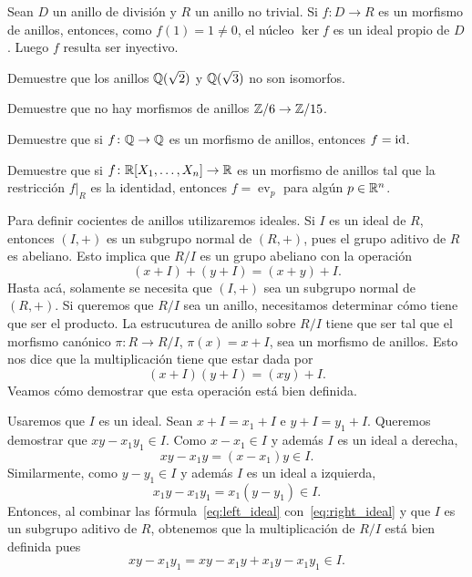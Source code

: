 \begin{example}
Sean $D$ un anillo de división y $R$ un anillo no trivial. Si $f\colon D\to R$ es un morfismo de anillos, entonces, como $f(1)=1\ne0$,
el núcleo $\ker f$ es un ideal propio de $D$. Luego $f$ resulta ser inyectivo.   	 
\end{example}

\begin{exercise}
\label{xca:sqrt2sqrt3}
Demuestre que los anillos $\mathbb{Q}(\sqrt{2})$ y $\mathbb{Q}(\sqrt{3})$ no son isomorfos.	
\end{exercise}

\begin{exercise}
\label{xca:Z6Z15}
Demuestre que no hay morfismos de anillos $\mathbb{Z}/6\to\mathbb{Z}/15$. 	
\end{exercise}

\begin{exercise}
Demuestre que si $f\colon \mathbb{Q}\to\mathbb{Q}$ es un morfismo de anillos, entonces $f=\operatorname{id}$.  	
\end{exercise}

\begin{exercise}
Demuestre que si $f\colon\mathbb{R}[X_1,\dots,X_n]\to\mathbb{R}$ es un morfismo de anillos tal que la restricción $f|_R$ es la identidad, entonces $f=\operatorname{ev}_{p}$ para algún $p\in\mathbb{R}^n$. 	
\end{exercise}

Para definir cocientes de anillos utilizaremos ideales. Si $I$ es
un ideal de $R$, entonces $(I,+)$ es un subgrupo normal de $(R,+)$, pues el grupo aditivo de $R$ es abeliano. Esto implica que
$R/I$ es un grupo abeliano con la operación
\[
(x+I)+(y+I)=(x+y)+I.
\]
Hasta acá, solamente se necesita que $(I,+)$ sea un subgrupo normal de $(R,+)$. Si queremos que $R/I$ sea un anillo, necesitamos
determinar cómo tiene que ser el producto. La 
estrucuturea de anillo sobre $R/I$ tiene que ser tal que el morfismo canónico   
$\pi\colon R\to R/I$, $\pi(x)=x+I$, sea un morfismo de anillos. Esto nos dice que la multiplicación 
tiene que estar dada por
\[
(x+I)(y+I)=(xy)+I.
\]
Veamos cómo demostrar que esta operación está bien definida. 

Usaremos que $I$ es un ideal. 
Sean $x+I=x_{1}+I$ e $y+I=y_{1}+I$. Queremos demostrar que $xy-x_{1}y_{1}\in I$.
Como $x-x_{1}\in I$ y además $I$ es un ideal a derecha, 
\begin{equation}
xy-x_{1}y=(x-x_{1})y\in I.\label{eq:right_ideal}
\end{equation}
Similarmente, como $y-y_{1}\in I$ y además $I$ es un ideal a izquierda,  
\begin{equation}
x_{1}y-x_{1}y_{1}=x_{1}(y-y_{1})\in I.\label{eq:left_ideal}
\end{equation}
Entonces, al combinar las fórmula~\eqref{eq:left_ideal} con~\eqref{eq:right_ideal} y 
que $I$ es un subgrupo aditivo de $R$, obtenemos que 
la multiplicación de $R/I$ está bien definida pues  
\[
xy-x_{1}y_{1}=xy-x_{1}y+x_{1}y-x_{1}y_{1}\in I.
\]


